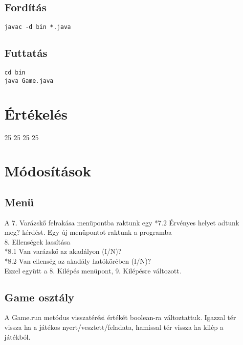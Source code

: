\subsection{Fordítás}

\lstset{escapeinside=`', xleftmargin=10pt, frame=single, basicstyle=\ttfamily\footnotesize, language=sh}
\begin{lstlisting}
javac -d bin *.java
\end{lstlisting}

\subsection{Futtatás}

\lstset{escapeinside=`', xleftmargin=10pt, frame=single, basicstyle=\ttfamily\footnotesize, language=sh}
\begin{lstlisting}
cd bin
java Game.java
\end{lstlisting}

\section{Értékelés}

\begin{ertekeles}
{25}        %
{25}
{25}
{25}
\end{ertekeles}

\section{Módosítások}
\subsection{Menü}
A 7. Varázskő felrakása menüpontba raktunk egy *7.2 Érvényes helyet adtunk meg? kérdést.
Egy új menüpontot raktunk a programba \\
8. Ellenségek lassítása \\
*8.1 Van varázskő az akadályon (I/N)? \\
*8.2 Van ellenség az akadály hatókörében (I/N)? \\
Ezzel együtt a 8. Kilépés menüpont, 9. Kilépésre változott. \\

\subsection{Game osztály}
A Game.run metódus visszatérési értékét boolean-ra változtattuk. Igazzal tér vissza ha a játékos nyert/vesztett/feladata, hamissal tér vissza ha kilép a játékból.

